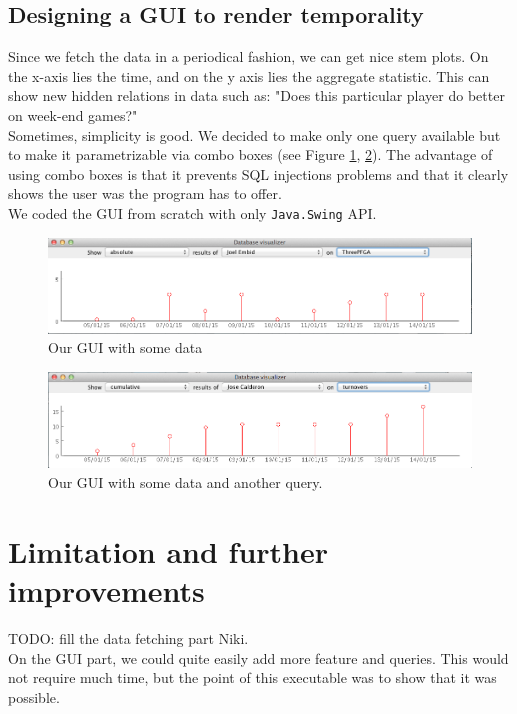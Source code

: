 \documentclass[paper=A4, fontsize=11pt]{scrartcl} %
\begin{document}
\subsection{Designing a GUI to render temporality}
Since we fetch the data in a periodical fashion, we can get nice stem plots. On the x-axis lies the time, and on the y axis lies the aggregate statistic. This can show new hidden relations in data such as: "Does this particular player do better on week-end games?"\\

Sometimes, simplicity is good. We decided to make only one query available but to make it parametrizable via combo boxes (see Figure \ref{sc1}, \ref{sc2}). The advantage of using combo boxes is that it prevents SQL injections problems and that it clearly shows the user was the program has to offer.\\

We coded the GUI from scratch with only \verb!Java.Swing! API.

\begin{figure}[h]
\includegraphics[scale=0.4]{sc1.png}
\centering
\caption{Our GUI with some data}
\label{sc1}
\end{figure}

\begin{figure}[h]
\includegraphics[scale=0.4]{sc2.png}
\centering
\caption{Our GUI with some data and another query.}
\label{sc2}
\end{figure}

\section{Limitation and further improvements}
TODO: fill the data fetching part Niki.\\

On the GUI part, we could quite easily add more feature and queries. This would not require much time, but the point of this executable was to show that it was possible.
\end{document}
